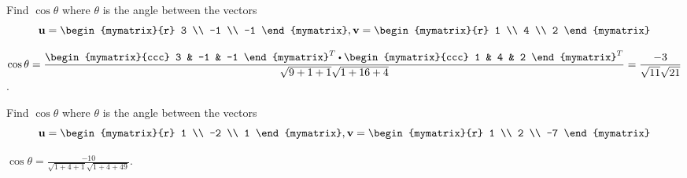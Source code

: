 
\begin{ex}
  Find $\cos \theta$ where $\theta$ is the angle between the vectors
  \begin{equation*}
    \vect{u}
    =
    \begin{mymatrix}{r}
      3 \\
      -1 \\
      -1
    \end{mymatrix},
    \vect{v}
    =
    \begin{mymatrix}{r}
      1 \\
      4 \\
      2
    \end{mymatrix}
  \end{equation*}
  \begin{sol}
    $\displaystyle\cos\theta=\frac{\begin{mymatrix}{ccc}
        3 & -1 & -1
      \end{mymatrix}^T \dotprod
      \begin{mymatrix}{ccc}
        1 & 4 & 2
      \end{mymatrix}^T}
    {\sqrt{9+1+1}\sqrt{1+16+4}}= \frac{-3}{\sqrt{11}\sqrt{21}}$.
  \end{sol}
\end{ex}

\begin{ex}
  Find $\cos \theta$ where $\theta$ is the angle between the vectors
  \begin{equation*}
    \vect{u}
    =
    \begin{mymatrix}{r}
      1 \\
      -2 \\
      1
    \end{mymatrix},
    \vect{v}
    =
    \begin{mymatrix}{r}
      1 \\
      2 \\
      -7
    \end{mymatrix}
  \end{equation*}
  \begin{sol}
    $\displaystyle\cos\theta =
    \frac{-10}{\sqrt{1+4+1}\sqrt{1+4+49}}$.
  \end{sol}
\end{ex}

